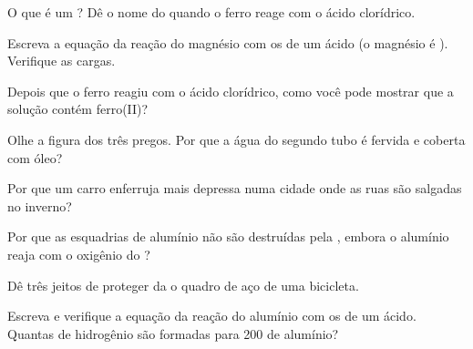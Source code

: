\begin{exercise}[$\star$]\label{exo:g9:metals-acids-corrosion:4}
O que é um ? Dê o nome do  quando o ferro
reage com o ácido clorídrico.
\end{exercise}

\begin{exercise}[$\star\star$]\label{exo:g9:metals-acids-corrosion:5}
Escreva a equação da reação do magnésio com os   de um ácido
(o  magnésio é ). Verifique as cargas.
\end{exercise}

\begin{exercise}[$\star\star$]\label{exo:g9:metals-acids-corrosion:6}
Depois que o ferro reagiu com o ácido clorídrico, como você pode mostrar
que a solução contém  ferro(II)?
\end{exercise}

\begin{exercise}[$\star\star$]\label{exo:g9:metals-acids-corrosion:7}
Olhe a figura dos três pregos. Por que a água do segundo tubo é fervida
e coberta com óleo?
\end{exercise}

\begin{exercise}[$\star\star$]\label{exo:g9:metals-acids-corrosion:8}
Por que um carro enferruja mais depressa numa cidade onde as ruas são
salgadas no inverno?
\end{exercise}

\begin{exercise}[$\star\star$]\label{exo:g9:metals-acids-corrosion:9}
Por que as esquadrias de alumínio não são destruídas pela ,
embora o alumínio reaja com o oxigênio do ?
\end{exercise}

\begin{exercise}[$\star\star$]\label{exo:g9:metals-acids-corrosion:10}
Dê três jeitos de proteger da  o quadro de aço de uma bicicleta.
\end{exercise}

\begin{exercise}[$\star\star\star$]\label{exo:g9:metals-acids-corrosion:11}
Escreva e verifique a equação da reação do alumínio com os  
de um ácido. Quantas  de hidrogênio são formadas para 200
 de alumínio?
\end{exercise}

